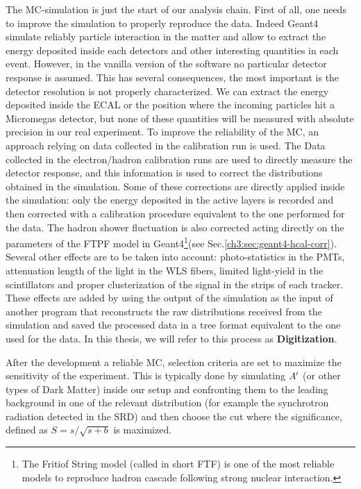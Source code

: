 The MC-simulation is just the start of our analysis chain. First of all, one needs to improve the simulation to properly reproduce the data. Indeed Geant4 simulate reliably particle interaction in the matter and allow to extract the energy deposited inside each detectors and other interesting quantities in each event. However, in the vanilla version of the software no particular detector response is assumed. This has several consequences, the most important is the detector resolution is not properly characterized. We can extract the energy deposited inside the ECAL or the position where the incoming particles hit a Micromegas detector, but none of these quantities will be measured with absolute precision in our real experiment. To improve the reliability of the MC, an approach relying on data collected in the calibration run is used. The Data collected in the electron/hadron calibration runs are used to directly measure the detector response, and this information is used to correct the distributions obtained in the simulation. Some of these corrections are directly applied inside the simulation: only the energy deposited in the active layers is recorded and then corrected with a calibration procedure equivalent to the one performed for the data. The hadron shower fluctuation is also corrected acting directly on the parameters of the FTPF model in Geant4\footnote{The Fritiof String model (called in short FTF) is one of the most reliable models to reproduce hadron cascade following strong nuclear interaction\cite{Uzhinsky:2013hea}.}(see Sec.\ref{ch3:sec:geant4-hcal-corr}). Several other effects are to be taken into account: photo-statistics in the PMTs, attenuation length of the light in the WLS fibers, limited light-yield in the scintillators and proper clusterization of the signal in the strips of each tracker. These effects are added by using the output of the simulation as the input of another program that reconstructs the raw distributions received from the simulation and saved the processed data in a tree format equivalent to the one used for the data. In this thesis, we will refer to this process as \textbf{Digitization}.

After the development a reliable MC, selection criteria are set to maximize the sensitivity of the experiment. This is typically done by simulating $A'$ (or other types of Dark Matter) inside our setup and confronting them to the leading background in one of the relevant distribution (for example the synchrotron radiation detected in the SRD) and then choose the cut where the significance, defined as $S = s/\sqrt{s+b}$ is maximized.

